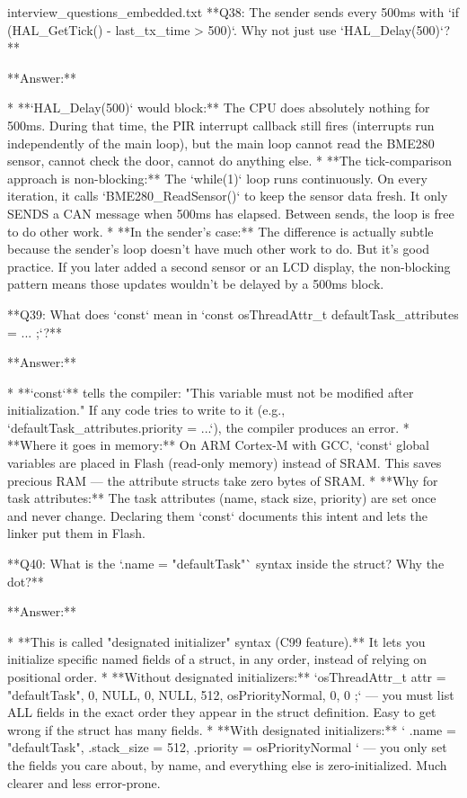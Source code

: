 \begin{filecontents*}{interview_questions_embedded.txt}
**Q38: The sender sends every 500ms with `if (HAL_GetTick() - last_tx_time > 500)`. Why not just use `HAL_Delay(500)`?**

**Answer:**

* **`HAL_Delay(500)` would block:** The CPU does absolutely nothing for 500ms. During that time, the PIR interrupt callback still fires (interrupts run independently of the main loop), but the main loop cannot read the BME280 sensor, cannot check the door, cannot do anything else.
* **The tick-comparison approach is non-blocking:** The `while(1)` loop runs continuously. On every iteration, it calls `BME280_ReadSensor()` to keep the sensor data fresh. It only SENDS a CAN message when 500ms has elapsed. Between sends, the loop is free to do other work.
* **In the sender's case:** The difference is actually subtle because the sender's loop doesn't have much other work to do. But it's good practice. If you later added a second sensor or an LCD display, the non-blocking pattern means those updates wouldn't be delayed by a 500ms block.

**Q39: What does `const` mean in `const osThreadAttr_t defaultTask_attributes = { ... };`?**

**Answer:**

* **`const`** tells the compiler: "This variable must not be modified after initialization." If any code tries to write to it (e.g., `defaultTask_attributes.priority = ...`), the compiler produces an error.
* **Where it goes in memory:** On ARM Cortex-M with GCC, `const` global variables are placed in Flash (read-only memory) instead of SRAM. This saves precious RAM — the attribute structs take zero bytes of SRAM.
* **Why for task attributes:** The task attributes (name, stack size, priority) are set once and never change. Declaring them `const` documents this intent and lets the linker put them in Flash.

**Q40: What is the `.name = "defaultTask"` syntax inside the struct? Why the dot?**

**Answer:**

* **This is called "designated initializer" syntax (C99 feature).** It lets you initialize specific named fields of a struct, in any order, instead of relying on positional order.
* **Without designated initializers:** `osThreadAttr_t attr = { "defaultTask", 0, NULL, 0, NULL, 512, osPriorityNormal, 0, 0 };` — you must list ALL fields in the exact order they appear in the struct definition. Easy to get wrong if the struct has many fields.
* **With designated initializers:** `{ .name = "defaultTask", .stack_size = 512, .priority = osPriorityNormal }` — you only set the fields you care about, by name, and everything else is zero-initialized. Much clearer and less error-prone.


\end{filecontents*}
